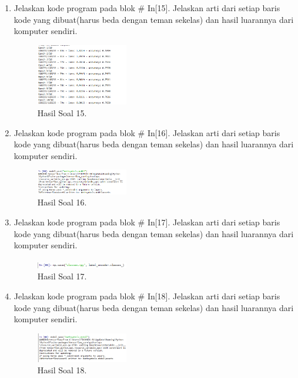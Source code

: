 \begin{enumerate}
    \item Jelaskan kode program pada blok \# In[15]. Jelaskan arti dari setiap baris kode yang dibuat(harus beda dengan teman sekelas) dan hasil luarannya dari komputer sendiri.
    \hfill\break
    
    \begin{figure}[H]
        \centering
            \includegraphics[width=4cm]{figures/1174096/tugas7/praktek_15.PNG}
            \caption{Hasil Soal 15.}
        \end{figure}
        
    \item Jelaskan kode program pada blok \# In[16]. Jelaskan arti dari setiap baris kode yang dibuat(harus beda dengan teman sekelas) dan hasil luarannya dari komputer sendiri.
    \hfill\break
    
    \begin{figure}[H]
        \centering
            \includegraphics[width=4cm]{figures/1174096/tugas7/praktek_16.PNG}
            \caption{Hasil Soal 16.}
        \end{figure}
        
    \item Jelaskan kode program pada blok \# In[17]. Jelaskan arti dari setiap baris kode yang dibuat(harus beda dengan teman sekelas) dan hasil luarannya dari komputer sendiri.
    \hfill\break
    
    \begin{figure}[H]
        \centering
            \includegraphics[width=4cm]{figures/1174096/tugas7/praktek_17.PNG}
            \caption{Hasil Soal 17.}
        \end{figure}
        
    \item Jelaskan kode program pada blok \# In[18]. Jelaskan arti dari setiap baris kode yang dibuat(harus beda dengan teman sekelas) dan hasil luarannya dari komputer sendiri.
    \hfill\break
    
    \begin{figure}[H]
        \centering
            \includegraphics[width=4cm]{figures/1174096/tugas7/praktek_18.PNG}
            \caption{Hasil Soal 18.}
        \end{figure}
        

\end{enumerate}
